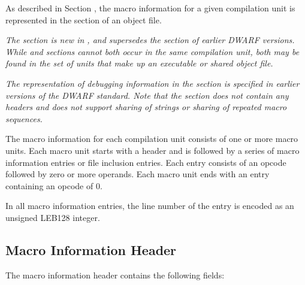 As described in 
Section ,
the macro information for a
given compilation unit is represented in the 
\dotdebugmacro{}
section of an object file. 

\textit{The \dotdebugmacro{} section is new in 
\DWARFVersionV, and supersedes the
\dotdebugmacinfo{} section of earlier DWARF versions. 
While \dotdebugmacro{} and \dotdebugmacinfo{}
sections cannot both occur in the same compilation unit, both may be found in the 
set of units that make up an executable or shared object file.}

\textit{The representation of debugging information in the \dotdebugmacinfo{} section is specified
in earlier versions of the DWARF standard. Note that the \dotdebugmacinfo{} section does not contain 
any headers and does not support sharing of strings or sharing of repeated macro sequences.}

The macro information for each compilation unit consists of one or
more macro units.  Each macro unit starts with a header
and is followed by a series of macro information entries or file
inclusion entries.  Each entry consists of an opcode followed by
zero or more operands. Each macro unit ends with an entry
containing an opcode of 0.

In all macro information entries,
the line number of the entry is encoded as an
unsigned LEB128 integer.

\subsection{Macro Information Header}
The macro information header contains the following fields:

